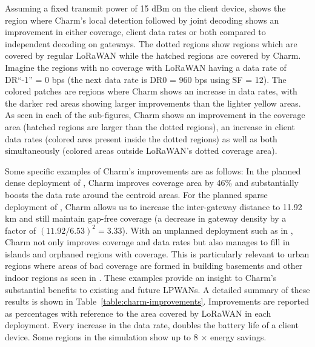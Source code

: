 Assuming a fixed transmit power of 15 dBm on the client device,
 shows the region where Charm's local detection
followed by joint decoding shows an improvement in either coverage, client
data rates or both compared to independent decoding on gateways. The dotted
regions show regions which are covered by regular LoRaWAN while the hatched
regions are covered by Charm. Imagine the regions with no coverage with
LoRaWAN having a data rate of DR``-1'' = 0 bps (the next data rate is DR0 =
960 bps using SF = 12). The colored patches are regions where Charm shows an
increase in data rates, with the darker red areas showing larger improvements
than the lighter yellow areas. As seen in each of the sub-figures, Charm shows
an improvement in the coverage area (hatched regions are larger than the
dotted regions), an increase in client data rates (colored ares present inside
the dotted regions) as well as both simultaneously (colored areas outside
LoRaWAN's dotted coverage area).

Some specific examples of Charm's improvements are as follows: In the planned
dense deployment of , Charm improves coverage area
by 46\% and substantially boosts the data rate around the centroid areas. For
the planned sparse deployment of , Charm allows us
to increase the inter-gateway distance to 11.92 km and still maintain gap-free
coverage (a decrease in gateway density by a factor of $(11.92/6.53)^2=3.33$).
With an unplanned deployment such as in , Charm not
only improves coverage and data rates but also manages to fill in islands and
orphaned regions with coverage. This is particularly relevant to urban regions
where areas of bad coverage are formed in building basements and other indoor
regions as seen in . These examples provide an
insight to Charm's substantial benefits to existing and future LPWANs. A
detailed summary of these results is shown in
Table~\ref{table:charm-improvements}. Improvements are reported as percentages
with reference to the area covered by LoRaWAN in each deployment. Every
increase in the data rate, doubles the battery life of a client device. Some
regions in the simulation show up to 8 $\times$ energy savings.

